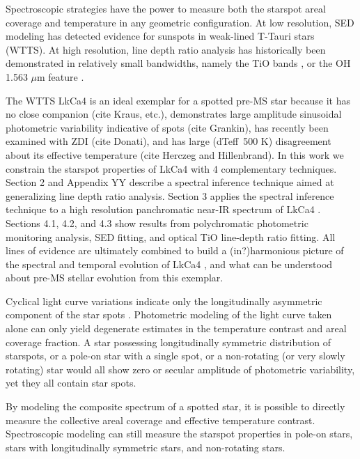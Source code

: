 \documentclass[twocolumn]{emulateapj}%
\newcommand{\name}{LkCa4 }
\begin{document}
Spectroscopic strategies have the power to measure both the starspot areal coverage and temperature in any geometric configuration.  At low resolution, SED modeling \citep{wolk96} has detected evidence for sunspots in weak-lined T-Tauri stars (WTTS).  At high resolution, line depth ratio analysis has historically been demonstrated in relatively small bandwidths, namely the TiO bands \citep{neff95,oneal96,oneal98,oneal04}, or the OH 1.563 $\mu$m feature \citep{oneal01}. 

The WTTS \name is an ideal exemplar for a spotted pre-MS star because it has no close companion (cite Kraus, etc.), demonstrates large amplitude sinusoidal photometric variability indicative of spots (cite Grankin), has recently been examined with ZDI (cite Donati), and has large (dTeff~500 K) disagreement about its effective temperature (cite Herczeg and Hillenbrand).  In this work we constrain the starspot properties of \name with 4 complementary techniques.  Section 2 and Appendix YY describe a spectral inference technique aimed at generalizing line depth ratio analysis.  Section 3 applies the spectral inference technique to a high resolution panchromatic near-IR spectrum of \name.  Sections 4.1, 4.2, and 4.3 show results from polychromatic photometric monitoring analysis, SED fitting, and optical TiO line-depth ratio fitting.  All lines of evidence are ultimately combined to build a (in?)harmonious picture of the spectral and temporal evolution of \name, and what can be understood about pre-MS stellar evolution from this exemplar.



Cyclical light curve variations indicate only the longitudinally asymmetric component of the star spots \citep{harrison12}.  Photometric modeling of the light curve taken alone can only yield degenerate estimates in the temperature contrast and areal coverage fraction.  A star possessing longitudinally symmetric distribution of starspots, or a pole-on star with a single spot, or a non-rotating (or very slowly rotating) star would all show zero or secular amplitude of photometric variability, yet they all contain star spots.  

By modeling the composite spectrum of a spotted star, it is possible to directly measure the collective areal coverage and effective temperature contrast.  Spectroscopic modeling can still measure the starspot properties in pole-on stars, stars with longitudinally symmetric stars, and non-rotating stars.
\end{document}
